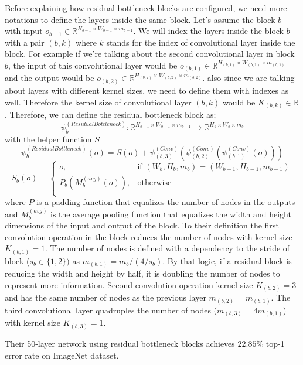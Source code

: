 Before explaining how residual bottleneck blocks are configured, we need more notations to define the layers inside the same block. Let's assume the block $b$ with input $o_{b-1} \in \mathbb{R}^{H_{b-1} \times W_{b-1} \times m_{b-1}}$. We will index the layers inside the block $b$ with a pair $(b, k)$ where $k$ stands for the index of convolutional layer inside the block. For example if we're talking about the second convolutional layer in block $b$, the input of this convolutional layer would be $o_{(b, 1)} \in \mathbb{R}^{H_{(b, 1)} \times W_{(b, 1)} \times m_{(b, 1)}}$ and the output would be $o_{(b, 2)} \in \mathbb{R}^{H_{(b, 2)} \times W_{(b, 2)} \times m_{(b, 2)}}$. also since we are talking about layers with different kernel sizes, we need to define them with indexes as well. Therefore the kernel size of convolutional layer $(b,k)$ would be $K_{(b,k)} \in \mathbb{R}$.
Therefore, we can define the residual bottleneck block as;
$$ \psi_b^{(ResidualBottleneck)}: \mathbb{R}^{H_{b-1} \times W_{b-1} \times m_{b-1}} \rightarrow  \mathbb{R}^{H_{b} \times W_{b} \times m_{b}} $$
with the helper function $S$
$$ \psi_b^{(ResidualBottleneck)}(o) =  S(o) + \psi_{(b, 3)}^{(Conv)}(\psi_{(b, 2)}^{(Conv)}(\psi_{(b, 1)}^{(Conv)}(o))) $$
\begin{equation*}
    S_b(o) = 
\begin{cases}
    o, &\text{if } (W_b, H_b, m_b) = (W_{b-1}, H_{b-1}, m_{b-1})\\
    P_b(M_b^{(avg)}(o)),& \text{otherwise}\\
\end{cases}
\end{equation*}
where $P$ is a padding function that equalizes the number of nodes in the outputs and $M_b^{(avg)}$ is the average pooling function that equalizes the width and height dimensions of the input and output of the block.
To their definition the first convolution operation in the block reduces the number of nodes with kernel size $K_{(b,1)}=1$. The number of nodes is defined with a dependency to the stride of block ($s_b \in \{1,2\})$ as $m_{(b,1)} = m_{b}/(4/s_b)$. By that logic, if a residual block is reducing the width and height by half, it is doubling the number of nodes to represent more information. Second convolution operation kernel size $K_{(b,2)}=3$ and has the same number of nodes as the previous layer $m_{(b,2)} = m_{(b,1)}$. The third convolutional layer quadruples the number of nodes ($m_{(b,3)} = 4m_{(b,1)}$) with kernel size $K_{(b,3)} = 1$.

Their 50-layer network using residual bottleneck blocks achieves $22.85\%$ top-1 error rate on ImageNet dataset.



